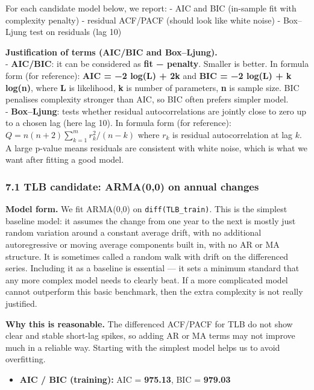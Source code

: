 \documentclass[
]{article}
\providecommand{\tightlist}{%
  \setlength{\itemsep}{0pt}\setlength{\parskip}{0pt}}
\begin{document}
For each candidate model below, we report: - AIC and BIC (in-sample fit
with complexity penalty) - residual ACF/PACF (should look like white
noise) - Box--Ljung test on residuals (lag 10)

\textbf{Justification of terms (AIC/BIC and Box--Ljung).}\\
- \textbf{AIC/BIC}: it can be considered as \textbf{fit − penalty}.
Smaller is better. In formula form (for reference): \textbf{AIC = −2
log(L) + 2k} and \textbf{BIC = −2 log(L) + k log(n)}, where \textbf{L}
is likelihood, \textbf{k} is number of parameters, \textbf{n} is sample
size. BIC penalises complexity stronger than AIC, so BIC often prefers
simpler model.\\
- \textbf{Box--Ljung}: tests whether residual autocorrelations are
jointly close to zero up to a chosen lag (here lag 10). In formula form
(for reference): \(Q = n(n+2)\sum_{k=1}^{m} r_k^2/(n-k)\) where \(r_k\)
is residual autocorrelation at lag \(k\). A large p-value means
residuals are consistent with white noise, which is what we want after
fitting a good model.

\subsubsection{7.1 TLB candidate: ARMA(0,0) on annual
changes}\label{tlb-candidate-arma00-on-annual-changes}

\textbf{Model form.} We fit ARMA(0,0) on \texttt{diff(TLB\_train)}. This
is the simplest baseline model: it assumes the change from one year to
the next is mostly just random variation around a constant average
drift, with no additional autoregressive or moving average components
built in, with no AR or MA structure. It is sometimes called a random
walk with drift on the differenced series. Including it as a baseline is
essential --- it sets a minimum standard that any more complex model
needs to clearly beat. If a more complicated model cannot outperform
this basic benchmark, then the extra complexity is not really justified.

\textbf{Why this is reasonable.} The differenced ACF/PACF for TLB do not
show clear and stable short-lag spikes, so adding AR or MA terms may not
improve much in a reliable way. Starting with the simplest model helps
us to avoid overfitting.

\begin{itemize}
\tightlist
\item
  \textbf{AIC / BIC (training):} AIC = \textbf{975.13}, BIC =
  \textbf{979.03}
\end{itemize}
\end{document}
